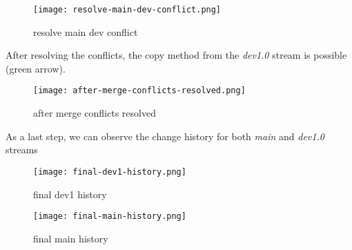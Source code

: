 \begin{figure}[H]
    \centering
    \texttt{[image: resolve-main-dev-conflict.png]}
    \setlength{\belowcaptionskip}{-10pt}
    \caption{resolve main dev conflict}
    \label{fig:resolve-main-dev-conflict}
\end{figure}

After resolving the conflicts, the copy method from the \textit{dev1.0} stream is possible (green arrow).
\begin{figure}[H]
    \centering
    \texttt{[image: after-merge-conflicts-resolved.png]}
    \caption{after merge conflicts resolved}
    \label{fig:after-merge-conflicts-resolved}
\end{figure}
As a last step, we can observe the change history for both \textit{main} and \textit{dev1.0} streams 
\begin{figure}[H]
    \centering
    \texttt{[image: final-dev1-history.png]}
    \caption{final dev1 history}
    \label{fig:final-dev1-history}
\end{figure}

\begin{figure}[H]
    \centering
    \texttt{[image: final-main-history.png]}
    \caption{final main history}
    \label{fig:final-main-history}
\end{figure}